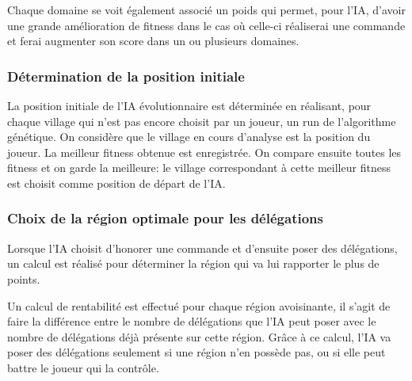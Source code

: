 		Chaque domaine se voit également associé un poids qui permet, pour l'IA, d'avoir une grande amélioration de
		fitness dans le cas où celle-ci réaliserai une commande et ferai augmenter son score dans un ou plusieurs domaines.
		
	\subsubsection{Détermination de la position initiale}
	
		La position initiale de l'IA évolutionnaire est déterminée en réalisant, pour chaque village qui n'est pas
		encore choisit par un joueur, un run de l'algorithme génétique. On considère que le village en cours d'analyse est la position du joueur. La meilleur fitness obtenue est enregistrée. On compare ensuite toutes les fitness
		et on garde la meilleure: le village correspondant à cette meilleur fitness est choisit comme position de départ de l'IA.
		
	\subsubsection{Choix de la région optimale pour les délégations}
	
		Lorsque l'IA choisit d'honorer une commande et d'ensuite poser des délégations, un calcul est réalisé pour déterminer la région qui va lui rapporter le plus de points.
		
		Un calcul de rentabilité est effectué pour chaque région avoisinante, il s'agit de faire la différence entre le nombre de délégations que l'IA peut poser avec le nombre de délégations déjà présente sur cette région.
		Grâce à ce calcul, l'IA va poser des délégations seulement si une région n'en possède pas, ou si elle peut battre le joueur qui la contrôle.
		
